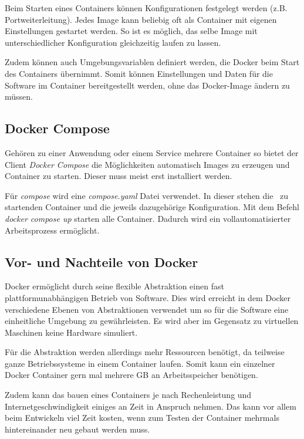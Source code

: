 Beim Starten eines Containers können Konfigurationen festgelegt werden (z.B. Portweiterleitung).
Jedes Image kann beliebig oft als Container mit eigenen Einstellungen gestartet werden. So ist es möglich, das selbe Image mit unterschiedlicher Konfiguration gleichzeitig laufen zu lassen.

Zudem können auch Umgebungsvariablen definiert werden, die Docker beim Start des Containers übernimmt. Somit können Einstellungen und Daten für die Software im Container bereitgestellt werden, ohne das Docker-Image ändern zu müssen.

\cite{dockerDummies}

\subsection{Docker Compose }
Gehören zu einer Anwendung oder einem Service mehrere Container so bietet der Client \emph{Docker Compose} die Möglichkeiten automatisch Images zu erzeugen und Container zu starten. Dieser muss meist erst installiert werden.

Für \emph{compose} wird eine \emph{compose.yaml} Datei verwendet. In dieser stehen die  zu startenden Container und die jeweils dazugehörige Konfiguration.
Mit dem Befehl \emph{docker compose up} starten alle Container.
Dadurch wird ein vollautomatisierter Arbeitsprozess ermöglicht.

\subsection{Vor- und Nachteile von Docker }
Docker ermöglicht durch seine flexible Abstraktion einen fast plattformunabhängigen Betrieb von Software. Dies wird erreicht in dem Docker verschiedene Ebenen von Abstraktionen verwendet um so für die Software eine einheitliche Umgebung zu gewährleisten. Es wird aber im Gegensatz zu virtuellen Maschinen keine Hardware simuliert.

Für die Abstraktion werden allerdings mehr Ressourcen benötigt, da teilweise ganze Betriebssysteme in einem Container laufen. Somit kann ein einzelner Docker Container gern mal mehrere GB an Arbeitsspeicher benötigen.

Zudem kann das bauen eines Containers je nach Rechenleistung und Internetgeschwindigkeit einiges an Zeit in Anspruch nehmen. Das kann vor allem beim Entwickeln viel Zeit kosten, wenn zum Testen der Container mehrmals hintereinander neu gebaut werden muss.

\cite{dockerDummies}
\cite{dockerComposeOverview}

